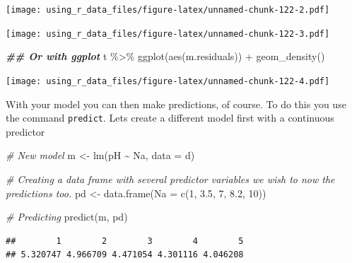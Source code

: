 \documentclass[
]{book}
\newenvironment{Shaded}{\begin{snugshade}}{\end{snugshade}}
\newcommand{\AttributeTok}[1]{\textcolor[rgb]{0.77,0.63,0.00}{#1}}
\newcommand{\CommentTok}[1]{\textcolor[rgb]{0.56,0.35,0.01}{\textit{#1}}}
\newcommand{\DecValTok}[1]{\textcolor[rgb]{0.00,0.00,0.81}{#1}}
\newcommand{\DocumentationTok}[1]{\textcolor[rgb]{0.56,0.35,0.01}{\textbf{\textit{#1}}}}
\newcommand{\FloatTok}[1]{\textcolor[rgb]{0.00,0.00,0.81}{#1}}
\newcommand{\FunctionTok}[1]{\textcolor[rgb]{0.00,0.00,0.00}{#1}}
\newcommand{\NormalTok}[1]{#1}
\newcommand{\OtherTok}[1]{\textcolor[rgb]{0.56,0.35,0.01}{#1}}
\newcommand{\SpecialCharTok}[1]{\textcolor[rgb]{0.00,0.00,0.00}{#1}}
\begin{document}
\texttt{[image: using\_r\_data\_files/figure-latex/unnamed-chunk-122-2.pdf]}

\begin{Shaded}
\end{Shaded}

\texttt{[image: using\_r\_data\_files/figure-latex/unnamed-chunk-122-3.pdf]}

\begin{Shaded}
\begin{Highlighting}[]
\DocumentationTok{\#\# Or with ggplot}
\NormalTok{t }\SpecialCharTok{\%\textgreater{}\%} 
  \FunctionTok{ggplot}\NormalTok{(}\FunctionTok{aes}\NormalTok{(m.residuals)) }\SpecialCharTok{+}
  \FunctionTok{geom\_density}\NormalTok{()}
\end{Highlighting}
\end{Shaded}

\texttt{[image: using\_r\_data\_files/figure-latex/unnamed-chunk-122-4.pdf]}

With your model you can then make predictions, of course. To do this you use the command \texttt{predict}. Lets create a different model first with a continuous predictor

\begin{Shaded}
\begin{Highlighting}[]
\CommentTok{\# New model}
\NormalTok{m }\OtherTok{\textless{}{-}} \FunctionTok{lm}\NormalTok{(pH }\SpecialCharTok{\textasciitilde{}}\NormalTok{ Na, }\AttributeTok{data =}\NormalTok{ d)}

\CommentTok{\# Creating a data frame with several predictor variables we wish to now the predictions too.}
\NormalTok{pd }\OtherTok{\textless{}{-}} \FunctionTok{data.frame}\NormalTok{(}\AttributeTok{Na =} \FunctionTok{c}\NormalTok{(}\DecValTok{1}\NormalTok{, }\FloatTok{3.5}\NormalTok{, }\DecValTok{7}\NormalTok{, }\FloatTok{8.2}\NormalTok{, }\DecValTok{10}\NormalTok{))}

\CommentTok{\# Predicting}
\FunctionTok{predict}\NormalTok{(m, pd)}
\end{Highlighting}
\end{Shaded}

\begin{verbatim}
##        1        2        3        4        5 
## 5.320747 4.966709 4.471054 4.301116 4.046208
\end{verbatim}
\end{document}
